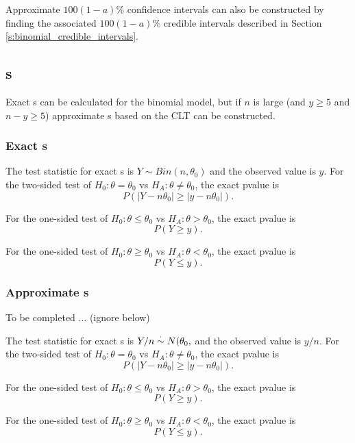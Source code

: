 Approximate $100(1-a)$\% confidence intervals can also be constructed by finding
the associated $100(1-a)$\% credible intervals described in Section 
\ref{s:binomial_credible_intervals}.


\subsection{\pvalue{}s}

Exact \pvalue{}s can be calculated for the binomial model, 
but if $n$ is large (and $y\ge 5$ and $n-y\ge 5$) 
approximate \pvalue{}s based on the CLT can be constructed.

\subsubsection{Exact \pvalue{}s}

The test statistic for exact \pvalue{}s is $Y\sim Bin(n,\theta_0)$ and
the observed value is $y$. 
For the two-sided test of $H_0: \theta=\theta_0$ vs $H_A: \theta\ne\theta_0$,
the exact pvalue is 
\[
P(|Y-n\theta_0|\ge |y-n\theta_0|).
\]

For the one-sided test of $H_0: \theta\le\theta_0$ vs $H_A: \theta>\theta_0$,
the exact pvalue is 
\[
P(Y\ge y).
\]

For the one-sided test of $H_0: \theta\ge\theta_0$ vs $H_A: \theta<\theta_0$,
the exact pvalue is 
\[
P(Y\le y).
\]

\subsubsection{Approximate \pvalue{}s}

To be completed ... (ignore below)

The test statistic for exact \pvalue{}s is $Y/n\stackrel{\cdot}{\sim} N(\theta_0, $ and
the observed value is $y/n$. 
For the two-sided test of $H_0: \theta=\theta_0$ vs $H_A: \theta\ne\theta_0$,
the exact pvalue is 
\[
P(|Y-n\theta_0|\ge |y-n\theta_0|).
\]

For the one-sided test of $H_0: \theta\le\theta_0$ vs $H_A: \theta>\theta_0$,
the exact pvalue is 
\[
P(Y\ge y).
\]

For the one-sided test of $H_0: \theta\ge\theta_0$ vs $H_A: \theta<\theta_0$,
the exact pvalue is 
\[
P(Y\le y).
\]
